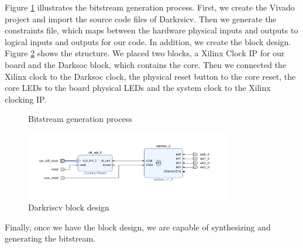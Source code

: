 Figure \ref{fig:bitstream_gen} illustrates the bitstream generation process. 
First, we create the Vivado project and import the source code files of Darkrsicv. Then we generate the constraints file, which maps between the hardware physical inputs and outputs to logical inputs and outputs for our code. In addition, we create the block design. Figure \ref{fig:block_design} shows the structure. We placed two blocks, a Xilinx Clock IP for our board and the Darksoc block, which contains the core. Then we connected the Xilinx clock to the Darksoc clock, the physical reset button to the core reset, the core LEDs to the board physical LEDs and the system clock to the Xilinx clocking IP.

\begin{figure}[h]
    \centering
    \caption{Bitstream generation process}
    \label{fig:bitstream_gen}
\end{figure}

\begin{figure}[h]
  \centering
  \includegraphics[width=0.8\textwidth]{../presentation/images/block-design.png}
  \caption{Darkriscv block design}
  \label{fig:block_design}
\end{figure}

Finally, once we have the block design, we are capable of synthesizing and generating the bitstream. 

